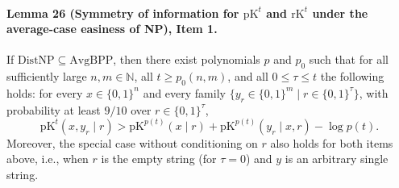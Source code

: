 \documentclass[10pt,a4paper]{article}
\begin{document}
\paragraph{Lemma 26 (Symmetry of information for $\mathrm{pK}^t$ and $\mathrm{rK}^t$ under the average-case easiness of NP), Item 1.} If $\mathrm{DistNP}\subseteq\mathrm{AvgBPP}$, then there exist polynomials $p$ and $p_0$ such that for all sufficiently large $n,m\in\mathbb N$, all $t\geq p_0(n,m)$, and all $0\leq\tau\leq t$ the following holds: for every $x\in\{0,1\}^n$ and every family $\{y_r\in\{0,1\}^m\mid r\in\{0,1\}^\tau\}$, with probability at least $9/10$ over $r\in\{0,1\}^\tau$,
\[\mathrm{pK}^t(x,y_r\mid r)>\mathrm{pK}^{p(t)}(x\mid r)+\mathrm{pK}^{p(t)}(y_r\mid x,r)-\log p(t).\]
Moreover, the special case without conditioning on $r$ also holds for both items above, i.e., when $r$ is the empty string (for $\tau=0$) and $y$ is an arbitrary single string.
\end{document}

